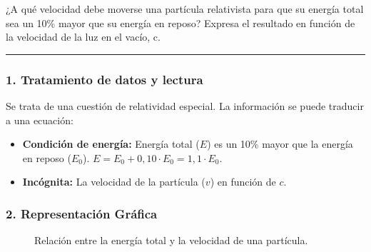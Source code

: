 \begin{cajaenunciado}
¿A qué velocidad debe moverse una partícula relativista para que su energía total sea un 10\% mayor que su energía en reposo? Expresa el resultado en función de la velocidad de la luz en el vacío, c.
\end{cajaenunciado}
\hrule

\subsubsection*{1. Tratamiento de datos y lectura}
Se trata de una cuestión de relatividad especial. La información se puede traducir a una ecuación:
\begin{itemize}
    \item \textbf{Condición de energía:} Energía total ($E$) es un 10\% mayor que la energía en reposo ($E_0$).
    $E = E_0 + 0,10 \cdot E_0 = 1,1 \cdot E_0$.
    \item \textbf{Incógnita:} La velocidad de la partícula ($v$) en función de $c$.
\end{itemize}

\subsubsection*{2. Representación Gráfica}
\begin{figure}[H]
    \centering
    \caption{Relación entre la energía total y la velocidad de una partícula.}
\end{figure}

